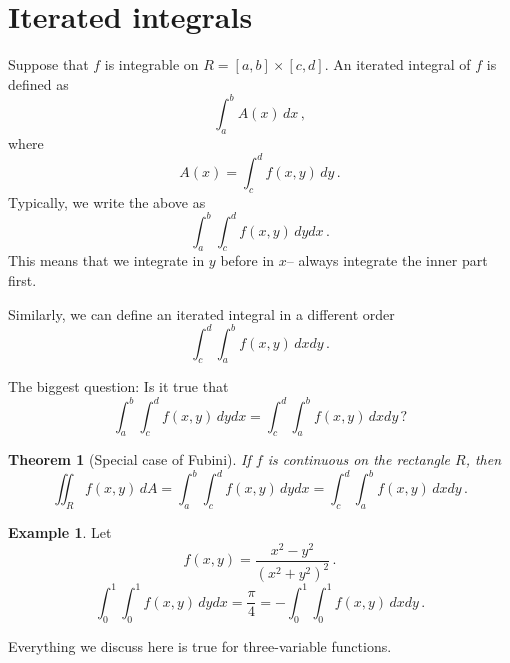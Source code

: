 \documentclass[
]{book}
\newtheorem{theorem}{Theorem}[chapter]
\theoremstyle{definition}
\theoremstyle{definition}
\newtheorem{example}{Example}[chapter]
\theoremstyle{definition}
\theoremstyle{definition}
\theoremstyle{remark}
\begin{document}
\hypertarget{iterated-integrals}{%
\section{Iterated integrals}\label{iterated-integrals}}

Suppose that \(f\) is integrable on \(R= [a,b]\times [c,d]\).
An iterated integral of \(f\) is defined as
\begin{equation*}
    \int_a^b A(x) \, dx \,,
\end{equation*}
where
\begin{equation*}
    A(x) = \int_c^d f(x,y) \, dy \,.
\end{equation*}
Typically, we write the above as
\begin{equation*}
   \int_a^b \int_c^d f(x,y) \, dy dx \,. 
\end{equation*}
This means that we integrate in \(y\) before in \(x\)-- always integrate the inner part first.

Similarly, we can define an iterated integral in a different order
\begin{equation*}
    \int_c^d \int_a^b f(x,y) \, dx dy \,.
\end{equation*}

The biggest question:
Is it true that
\begin{equation*}
   \int_a^b \int_c^d f(x,y) \, dy dx  =
    \int_c^d \int_a^b f(x,y) \, dx dy \,?
\end{equation*}

\begin{theorem}[Special case of Fubini]
If \(f\) is continuous on the rectangle \(R\), then
\begin{equation*}
    \iint_R f(x,y) \, dA = \int_a^b \int_c^d f(x,y) \, dy dx = \int_c^d \int_a^b f(x,y) \, dx dy \,.
\end{equation*}
\end{theorem}

\begin{example}
Let
\begin{equation*}
    f(x,y) =  \frac{x^2 - y^2}{(x^2 + y^2)^2} \,.
\end{equation*}
\begin{equation*}
    \int_0^1\int_0^1 f(x,y) \,dy dx = \frac{\pi}{4} = - \int_0^1\int_0^1 f(x,y) \, dx dy \,.
\end{equation*}
\end{example}

Everything we discuss here is true for three-variable functions.
\end{document}
